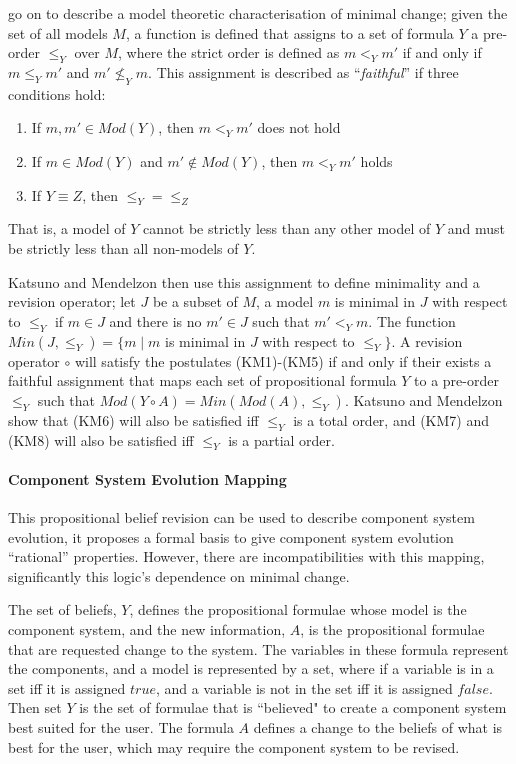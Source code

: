 \cite{katsuno1991propositional} go on to describe a model theoretic characterisation of minimal change; 
given the set of all models $M$, a function is defined that assigns to a set of formula $Y$ a pre-order $\leq_{Y}$ over $M$,
where the strict order is defined as $m <_Y m'$ if and only if $m \leq_Y m'$ and $m' \not \leq_Y m$. 
This assignment is described as ``\textit{faithful}'' if three conditions hold:
\begin{enumerate}
  \item If $m,m' \in Mod(Y)$, then $m <_Y m'$ does not hold
  \item If $m \in Mod(Y)$ and $m' \not\in Mod(Y)$, then $m <_Y m'$ holds
  \item If $Y \equiv Z$, then $\leq_Y = \leq_Z$  
\end{enumerate}

That is, a model of $Y$ cannot be strictly less than any other model of $Y$ and must be strictly less than all non-models of $Y$.

Katsuno and Mendelzon then use this assignment to define minimality and a revision operator; 
let $J$ be a subset of $M$, 
a model $m$ is minimal in $J$ with respect to $\leq_{Y}$ if $m \in J$ and there is no $m' \in J$ such that $m' <_Y m$. 
The function $Min(J,\leq_{Y}) = \{ m \mid m$ is minimal in $J$ with respect to $\leq_{Y} \}$.
A revision operator $\circ$ will satisfy the postulates (KM1)-(KM5) if and only if
their exists a faithful assignment that maps each set of propositional formula $Y$ to a pre-order $\leq_{Y}$
such that $Mod(Y \circ A) = Min(Mod(A),\leq_{Y})$.
Katsuno and Mendelzon show that (KM6) will also be satisfied iff $\leq_{Y}$ is a total order,
and (KM7) and (KM8) will also be satisfied iff $\leq_{Y}$ is a partial order.

\paragraph{Component System Evolution Mapping}
This propositional belief revision can be used to describe component system evolution, it proposes a formal basis to give component system evolution ``rational'' properties.
However, there are incompatibilities with this mapping, significantly this logic's dependence on minimal change.

The set of beliefs, $Y$, defines the propositional formulae whose model is the component system,
and the new information, $A$, is the propositional formulae that are requested change to the system.
The variables in these formula represent the components, and a model is represented by a set, where if a variable is in a set iff it is assigned $true$, 
and a variable is not in the set iff it is assigned $false$. 
Then set $Y$ is the set of formulae that is ``believed" to create a component system best suited for the user.
The formula $A$ defines a change to the beliefs of what is best for the user, which may require the component system to be revised.

